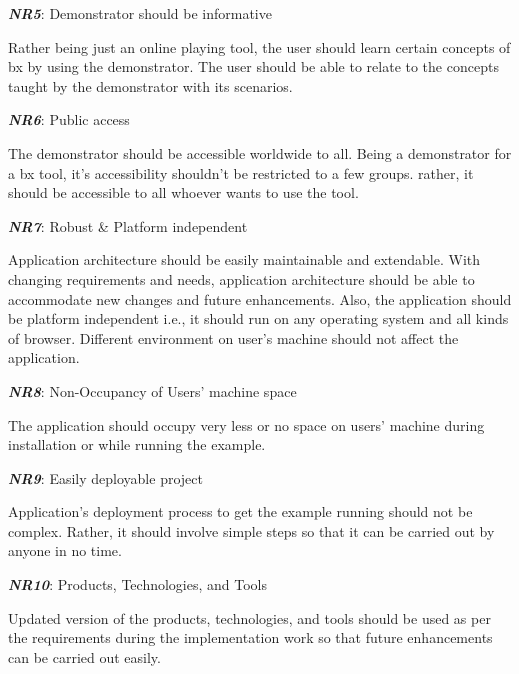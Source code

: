 \textbf{\textit{NR5}}: Demonstrator should be informative

Rather being just an online playing tool, the user should learn certain concepts of bx by using the demonstrator. The user should be able to relate to the concepts taught by the demonstrator with its scenarios.

\textbf{\textit{NR6}}: Public access

The demonstrator should be accessible worldwide to all. Being a demonstrator for a bx tool, it's accessibility shouldn't be restricted to a few groups. rather, it should be accessible to all whoever wants to use the tool.

\textbf{\textit{NR7}}: Robust \& Platform independent

Application architecture should be easily maintainable and extendable. With changing requirements and needs, application architecture should be able to accommodate new changes and future enhancements. Also, the application should be platform independent i.e., it should run on any operating system and all kinds of browser. Different environment on user's machine should not affect the application.

\textbf{\textit{NR8}}: Non-Occupancy of Users' machine space

The application should occupy very less or no space on users' machine during installation or while running the example. 
 
\textbf{\textit{NR9}}: Easily deployable project

Application's deployment process to get the example running should not be complex. Rather, it should involve simple steps so that it can be carried out by anyone in no time.

\textbf{\textit{NR10}}: Products, Technologies, and Tools

Updated version of the products, technologies, and tools should be used as per the requirements during the implementation work so that future enhancements can be carried out easily.

